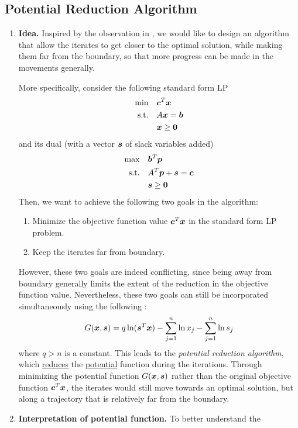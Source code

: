 \subsection{Potential Reduction Algorithm}
\begin{enumerate}
\item \textbf{Idea.} Inspired by the observation in
, we would like to design an algorithm
that allow the iterates to get closer to the optimal solution, while making
them far from the boundary, so that more progress can be made in the
movements generally.

More specifically, consider the following standard form LP
\begin{align*}
\text{min}\quad&\bm{c}^{T}\bm{x} \\
\text{s.t.}\quad&A\bm{x}=\bm{b} \\
&\bm{x}\ge \bm{0}
\end{align*}
and its dual (with a vector \(\bm{s}\) of slack variables added)
\begin{align*}
\text{max}\quad&\bm{b}^{T}\bm{p} \\
\text{s.t.}\quad&A^{T}\bm{p}+\bm{s}=\bm{c} \\
&\bm{s}\ge\bm{0}
\end{align*}
Then, we want to achieve the following two goals in the algorithm:
\begin{enumerate}
\item Minimize the objective function value \(\bm{c}^{T}\bm{x}\) in the
standard form LP problem.
\item Keep the iterates far from boundary.
\end{enumerate}
However, these two goals are indeed conflicting, since being away from boundary
generally limits the extent of the reduction in the objective function value.
Nevertheless, these two goals can still be incorporated simultaneously using
the following :
\[
G(\bm{x},\bm{s})=q\ln (\bm{s}^{T}\bm{x})-\sum_{j=1}^{n}\ln x_j
-\sum_{j=1}^{n}\ln s_j
\]
where \(q>n\) is a constant. This leads to the \emph{potential reduction
algorithm}, which \underline{reduces} the \underline{potential} function during
the iterations. Through minimizing the potential function
\(G(\bm{x},\bm{s})\) rather than the original objective function
\(\bm{c}^{T}\bm{x}\), the iterates would still move towards an
optimal solution, but along a trajectory that is relatively far from the
boundary.
\item \textbf{Interpretation of potential function.} To better understand the

\end{enumerate}
